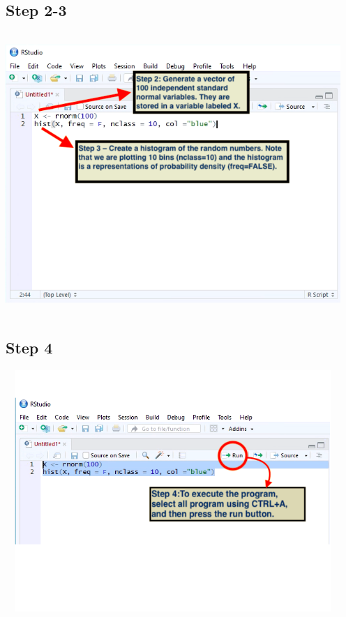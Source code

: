 \documentclass[a4paper]{report}
\begin{document}
\begin{flushleft}
         \subsection*{Step 2-3}
        \includegraphics[width=5in, height = 4.2in]{images/SP3.png}
        
        \subsection*{Step 4}
        \includegraphics[width=5in, height = 3.6in]{images/SP4.png}
        

\end{flushleft}
\end{document}
